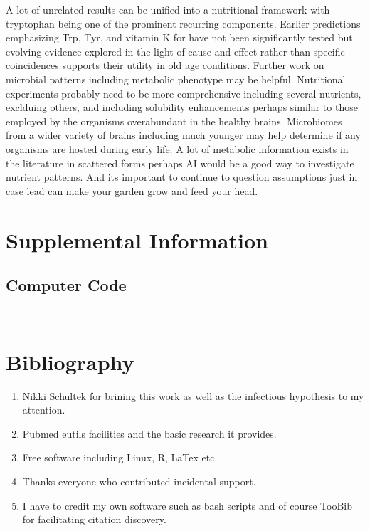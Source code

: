 \documentclass[aps,secnumarabic,balancelastpage,amsmath,amssymb,nofootinbib]{revtex4}
\newcommand{\mjmbasename}{\jobname}
\newcommand{\mjmaddbio}{releases,dailysnapx}
\begin{document}
A lot of unrelated results can be unified into a nutritional framework
with tryptophan being one of the prominent recurring components.
Earlier predictions emphasizing Trp, Tyr, and vitamin K
for \mjmdisease  have not been significantly tested but 
evolving evidence explored in the light of cause and effect
rather than specific coincidences supports their utility
in old age conditions. 
Further work on microbial patterns including
metabolic phenotype may be helpful. Nutritional experiments probably
need to be more comprehensive including several nutrients, exclduing
others, and including solubility enhancements perhaps similar
to those employed by the organisms overabundant in the healthy brains.  
Microbiomes from a wider variety of brains including much younger
may help determine if any organisms are hosted during early life.
A lot of metabolic information exists in the literature in
scattered forms perhaps AI would be a good way to investigate
nutrient patterns. 
And its important to continue to question assumptions just in 
case lead can make your garden grow and feed your head.

\section{Supplemental Information}

\subsection{Computer Code}


\begin{lstlisting}


\end{lstlisting}
\section{Bibliography}






\begin{acknowledgments} 

% 
\begin{enumerate}
\item Nikki Schultek for brining this work \cite{Schultek_Nikki_Schultek_LinkedIn_2023} as well as the infectious hypothesis to my attention. 
\item Pubmed eutils facilities and the basic research it provides. 
\item Free software including Linux, R, LaTex  etc.
\item Thanks everyone who contributed incidental support. 
\item I have to credit my own software such as bash scripts
 and of course TooBib\cite{mmarchywka-MJM-2021-002-v0.1.1-rg} for facilitating citation discovery. 
\end{enumerate}

\end{acknowledgments}
\end{document}
